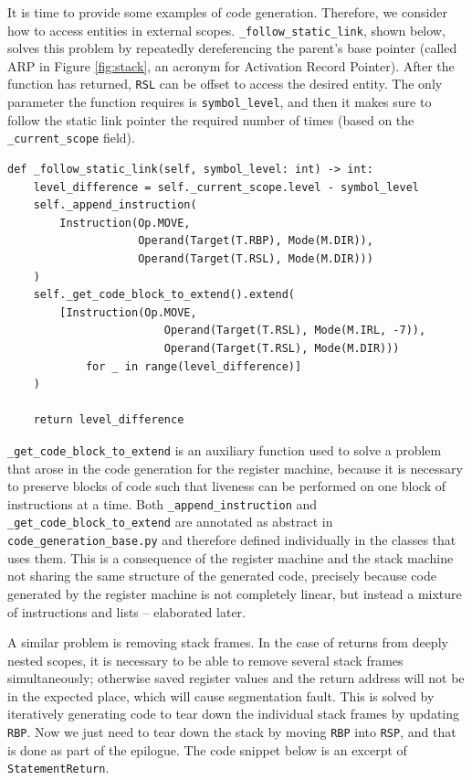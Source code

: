 It is time to provide some examples of code generation. Therefore, we consider how to access entities in external scopes. \texttt{\_follow\_static\_link}, shown below, solves this problem by repeatedly dereferencing the parent's base pointer (called ARP in Figure \ref{fig:stack}, an acronym for Activation Record Pointer). After the function has returned, \texttt{RSL} can be offset to access the desired entity. The only parameter the function requires is \texttt{symbol\_level}, and then it makes sure to follow the static link pointer the required number of times (based on the \texttt{\_current\_scope} field).

\begin{verbatim}
def _follow_static_link(self, symbol_level: int) -> int:
    level_difference = self._current_scope.level - symbol_level
    self._append_instruction(
        Instruction(Op.MOVE,
                    Operand(Target(T.RBP), Mode(M.DIR)),
                    Operand(Target(T.RSL), Mode(M.DIR)))
    )
    self._get_code_block_to_extend().extend(
        [Instruction(Op.MOVE,
                        Operand(Target(T.RSL), Mode(M.IRL, -7)),
                        Operand(Target(T.RSL), Mode(M.DIR)))
            for _ in range(level_difference)]
    )

    return level_difference
\end{verbatim}

\texttt{\_get\_code\_block\_to\_extend} is an auxiliary function used to solve a problem that arose in the code generation for the register machine, because it is necessary to preserve blocks of code such that liveness can be performed on one block of instructions at a time. Both \texttt{\_append\_instruction} and \texttt{\_get\_code\_block\_to\_extend} are annotated as abstract in \texttt{code\_generation\_base.py} and therefore defined individually in the classes that uses them. This is a consequence of the register machine and the stack machine not sharing the same structure of the generated code, precisely because code generated by the register machine is not completely linear, but instead a mixture of instructions and lists -- elaborated later.

A similar problem is removing stack frames. In the case of returns from deeply nested scopes, it is necessary to be able to remove several stack frames simultaneously; otherwise saved register values and the return address will not be in the expected place, which will cause segmentation fault. This is solved by iteratively generating code to tear down the individual stack frames by updating \texttt{RBP}. Now we just need to tear down the stack by moving \texttt{RBP} into \texttt{RSP}, and that is done as part of the epilogue. The code snippet below is an excerpt of \texttt{StatementReturn}.

